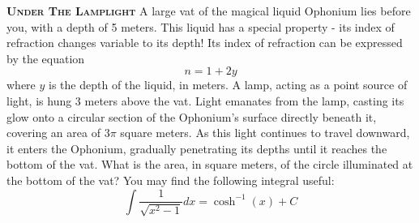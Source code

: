 \begin{problem}
{\textbf{\textsc{Under The Lamplight}}} A large vat of the magical liquid Ophonium lies before you, with a depth of 5 meters. This liquid has a special property - its index of refraction changes variable to its depth! Its index of refraction can be expressed by the equation $$n = 1 + 2y$$ where $y$ is the depth of the liquid, in meters. A lamp, acting as a point source of light, is hung 3 meters above the vat. Light emanates from the lamp, casting its glow onto a circular section of the Ophonium's surface directly beneath it, covering an area of $3\pi$ square meters. As this light continues to travel downward, it enters the Ophonium, gradually penetrating its depths until it reaches the bottom of the vat. What is the area, in square meters, of the circle illuminated at the bottom of the vat? You may find the following integral useful:
$$\int\frac{1}{\sqrt{x^2-1}}dx = \cosh^{-1}(x) + C$$
\end{problem}